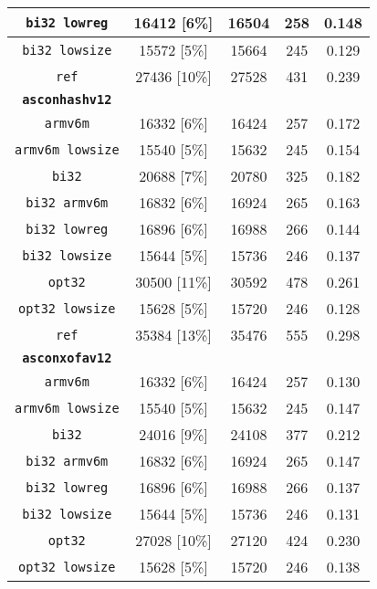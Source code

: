 \begin{table}[h]
\begin{adjustbox}{width=207pt}
\begin{tabular}{|c|c|c|c|c|}
        \hline
        \texttt{bi32 lowreg} & 16412 [6\%] & 16504 & 258 & 0.148 \\
        \hline
        \texttt{bi32 lowsize} & 15572 [5\%] & 15664 & 245 & 0.129 \\
        \hline
        \texttt{ref} & 27436 [10\%] & 27528 & 431 & 0.239 \\
        \hline
        \texttt{\textbf{asconhashv12}} & & & & \\
        \hline
        \texttt{armv6m} & 16332 [6\%] & 16424 & 257 & 0.172 \\
        \hline
        \texttt{armv6m lowsize} & 15540 [5\%] & 15632 & 245 & 0.154 \\
        \hline
        \texttt{bi32} & 20688 [7\%] & 20780 & 325 & 0.182 \\
        \hline
        \texttt{bi32 armv6m} & 16832 [6\%] & 16924 & 265 & 0.163 \\
        \hline
        \texttt{bi32 lowreg} & 16896 [6\%] & 16988 & 266 & 0.144 \\
        \hline
        \texttt{bi32 lowsize} & 15644 [5\%] & 15736 & 246 & 0.137 \\
        \hline
        \texttt{opt32} & 30500 [11\%] & 30592 & 478 & 0.261 \\
        \hline
        \texttt{opt32 lowsize} & 15628 [5\%] & 15720 & 246 & 0.128 \\
        \hline
        \texttt{ref} & 35384 [13\%] & 35476 & 555 & 0.298 \\
        \hline
        \texttt{\textbf{asconxofav12}} & & & & \\
        \hline
        \texttt{armv6m} & 16332 [6\%] & 16424 & 257 & 0.130 \\
        \hline
        \texttt{armv6m lowsize} & 15540 [5\%] & 15632 & 245 & 0.147 \\
        \hline
        \texttt{bi32} & 24016 [9\%] & 24108 & 377 & 0.212 \\
        \hline
        \texttt{bi32 armv6m} & 16832 [6\%] & 16924 & 265 & 0.147 \\
        \hline
        \texttt{bi32 lowreg} & 16896 [6\%] & 16988 & 266 & 0.137 \\
        \hline
        \texttt{bi32 lowsize} & 15644 [5\%] & 15736 & 246 & 0.131 \\
        \hline
        \texttt{opt32} & 27028 [10\%] & 27120 & 424 & 0.230 \\
        \hline
        \texttt{opt32 lowsize} & 15628 [5\%] & 15720 & 246 & 0.138 \\

\end{tabular}
\end{adjustbox}
\end{table}
